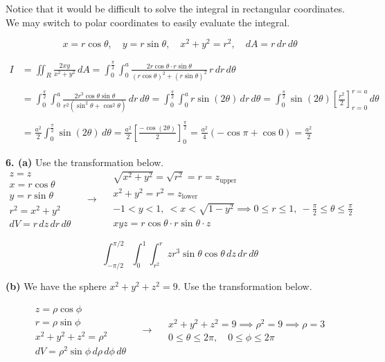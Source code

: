 \documentclass{article}
\begin{document}
Notice that it would be difficult to solve the integral in rectangular coordinates. We may switch to polar coordinates to easily evaluate the integral.

\[x=r\cos\theta,\quad y=r\sin\theta,\quad x^2+y^2=r^2,\quad dA=r\,dr\,d\theta\]

\begin{align*}{I}&=\iint_R\frac{2xy}{x^2+y^2}\,dA=\int_0^{\textstyle\frac\pi2}\int_0^a\frac{2r\cos\theta\cdot r\sin\theta}{\left(r\cos\theta\right)^2+\left(r\sin\theta\right)^2}\,r\,dr\,d\theta\\\\&=\int_0^{\textstyle\frac\pi2}\int_0^a\frac{2r^3\cos\theta\sin\theta}{r^2(\sin^2\theta+\cos^2\theta)}\,dr\,d\theta=\int_0^{\textstyle\frac\pi2}\int_0^a r \sin(2\theta)\,dr\,d\theta=\int_0^{\textstyle\frac\pi2}\sin(2\theta)\left[\frac{r^2}2\right]_{r=0}^{r=a}\,d\theta\\\\&=\frac{a^2}2\int_0^{\textstyle\frac\pi2}\sin(2\theta)\,d\theta=\frac{a^2}2\left[\frac{-\cos(2\theta)}2\right]_0^{\textstyle\frac\pi2}=\frac{a^2}4\left(-\cos\pi+\cos0\right)=\boxed{\frac{a^2}2}\end{align*}

\vspace{1em}

\textbf{6. (a)} Use the transformation below.
\[
\begin{array}{c}
z=z\\
x=r\cos\theta\\
y=r\sin\theta\\
r^2=x^2+y^2\\
dV=r\,dz\,dr\,d\theta
\end{array}\quad\rightarrow\quad
\begin{array}{c}
\sqrt{x^2+y^2}=\sqrt{r^2}=r=z_{\text{upper}}\\
x^2+y^2=r^2=z_{\text{lower}}\\
\displaystyle-1<y<1,\:<x<\sqrt{1-y^2}\implies0\leq r\leq1,\:-\frac\pi2\leq\theta\leq\frac\pi2\\
xyz=r\cos\theta\cdot r\sin\theta\cdot z
\end{array}
\]

\[\boxed{\int_{-\pi/2}^{\pi/2}\int_0^1\int_{r^2}^rzr^3\sin\theta\cos\theta\,dz\,dr\,d\theta}\]

\textbf{(b)} We have the sphere $x^2+y^2+z^2=9$. Use the transformation below.

\[
\begin{array}{c}
z=\rho\cos\phi\\
r=\rho\sin\phi\\
x^2+y^2+z^2=\rho^2\\
dV=\rho^2\sin\phi\,d\rho\,d\phi\,d\theta
\end{array}\quad\rightarrow\quad
\begin{array}{c}
x^2+y^2+z^2=9\implies\rho^2=9\implies\rho=3\\[1em]
0\leq\theta\leq2\pi,\quad0\leq\phi\leq2\pi
\end{array}
\]
\end{document}

